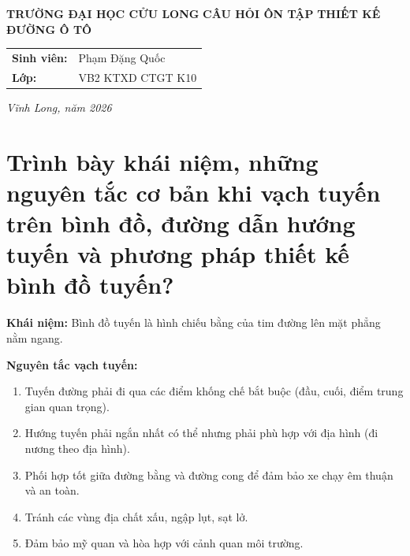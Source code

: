 \documentclass[12pt,a4paper]{article}
\begin{document}
\begin{titlepage}
    
    \centering
    \vspace*{0.5cm}
    {\fontsize{14}{17}\selectfont \textbf{TRƯỜNG ĐẠI HỌC CỬU LONG}}
    \vspace{3cm}
    {\fontsize{18}{21}\selectfont \textbf{\color{bkblue}CÂU HỎI ÔN TẬP}}
    \vspace{0.5cm}
    {\fontsize{20}{24}\selectfont \bfseries THIẾT KẾ ĐƯỜNG Ô TÔ}
    \vspace{2cm}
    
    \begin{tabular}{l l}
        \textbf{Sinh viên:} & Phạm Đặng Quốc \\
        \textbf{Lớp:} & VB2 KTXD CTGT K10 \\
    \end{tabular}
    \vfill
    {\fontsize{13}{16}\selectfont \textit{Vĩnh Long, năm 2026}}
    \restoregeometry
\end{titlepage}

\newpage

\section{Trình bày khái niệm, những nguyên tắc cơ bản khi vạch tuyến trên bình đồ, đường dẫn hướng tuyến và phương pháp thiết kế bình đồ tuyến?}
\textbf{Khái niệm:} Bình đồ tuyến là hình chiếu bằng của tim đường lên mặt phẳng nằm ngang.

\textbf{Nguyên tắc vạch tuyến:}
\begin{enumerate}
    \item Tuyến đường phải đi qua các điểm khống chế bắt buộc (đầu, cuối, điểm trung gian quan trọng).
    \item Hướng tuyến phải ngắn nhất có thể nhưng phải phù hợp với địa hình (đi nương theo địa hình).
    \item Phối hợp tốt giữa đường bằng và đường cong để đảm bảo xe chạy êm thuận và an toàn.
    \item Tránh các vùng địa chất xấu, ngập lụt, sạt lở.
    \item Đảm bảo mỹ quan và hòa hợp với cảnh quan môi trường.
\end{enumerate}
\end{document}

